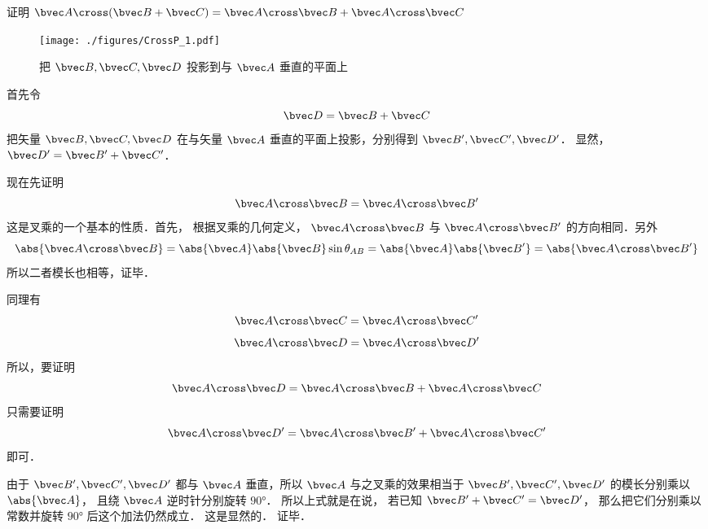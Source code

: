 
证明 $\bvec A \cross (\bvec B + \bvec C) = \bvec A \cross \bvec B + \bvec A \cross \bvec C$ 

\begin{figure}[ht]
\vskip-10pt
\centering
\texttt{[image: ./figures/CrossP\_1.pdf]}
\caption{把 $\bvec B,\bvec C,\bvec D$ 投影到与 $\bvec A$ 垂直的平面上}
\end{figure}

首先令
\begin{equation}
\bvec D = \bvec B + \bvec C
\end{equation}
把矢量 $\bvec B,\bvec C,\bvec D$ 在与矢量 $\bvec A$ 垂直的平面上投影，分别得到 $\bvec B',\bvec C',\bvec D'$． 显然，$\bvec D'=\bvec B'+\bvec C'$． 

现在先证明
\begin{equation}
\bvec A \cross \bvec B = \bvec A \cross \bvec B'
\end{equation} 
这是叉乘的一个基本的性质．首先，
根据叉乘的几何定义， $\bvec A \cross \bvec B$ 与
 $\bvec A \cross \bvec B'$ 的方向相同．另外
\begin{equation}
\abs{\bvec A \cross \bvec B}  = \abs{\bvec A} \abs{\bvec B} \sin{\theta_{AB}} = \abs{\bvec A} \abs{\bvec B'}=\abs{\bvec A \cross \bvec B'}
\end{equation}
所以二者模长也相等，证毕．

同理有 
\begin{equation}
\bvec A \cross \bvec C = \bvec A \cross \bvec C'
\end{equation}
\begin{equation}
\bvec A \cross \bvec D = \bvec A \cross \bvec D'
\end{equation}
所以，要证明
\begin{equation}
\bvec A \cross \bvec D = \bvec A \cross \bvec B + \bvec A \cross \bvec C
\end{equation}
只需要证明
\begin{equation}
\bvec A \cross \bvec D' = \bvec A \cross \bvec B' + \bvec A \cross \bvec C'
\end{equation}
即可．

由于 $\bvec B', \bvec C', \bvec D'$ 都与 $\bvec A$ 垂直，所以 $\bvec A$ 与之叉乘的效果相当于 $\bvec B', \bvec C', \bvec D'$ 的模长分别乘以 $\abs {\bvec A}$， 且绕 $\bvec A$ 逆时针分别旋转 $90°$． 所以上式就是在说， 若已知 $\bvec B' + \bvec C' = \bvec D'$， 那么把它们分别乘以常数并旋转 $90°$ 后这个加法仍然成立． 这是显然的． 证毕．
